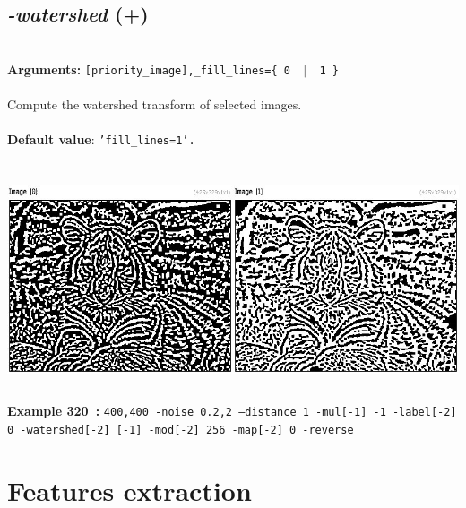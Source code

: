 \documentclass[a4paper,11pt,twoside]{book}
\begin{document}
\subsection{\emph{-watershed} (+)}\vspace*{-0.5em}
~\\\textbf{Arguments: } 
{\small \texttt{[priority\_image],\_fill\_lines=\{ 0 ~$|$~ 1 \}}}\\~\\
Compute the watershed transform of selected images.
~\\~\\\textbf{Default value}: {\small \texttt{'fill\_lines=1'.}}
\begin{center}\includegraphics[keepaspectratio=true,height=7cm,width=\textwidth]{img/gmic_def320.jpg}\\
{\footnotesize \textbf{Example 320~:} \texttt{400,400 -noise 0.2,2 --distance 1 -mul[-1] -1 -label[-2] 0 -watershed[-2] [-1] -mod[-2] 256 -map[-2] 0 -reverse}}
\end{center}
\section{Features extraction}
\end{document}
